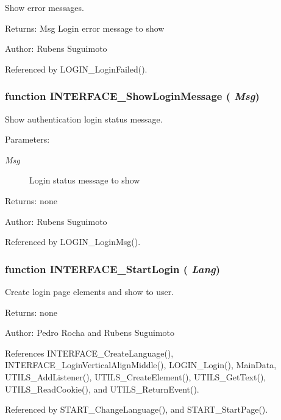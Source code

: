 Show error messages. 

\begin{Desc}
\item[Returns:]Msg Login error message to show \end{Desc}
\begin{Desc}
\item[Author:]Rubens Suguimoto \end{Desc}


Referenced by LOGIN\_\-LoginFailed().
\subsubsection[INTERFACE\_\-ShowLoginMessage]{\setlength{\rightskip}{0pt plus 5cm}function INTERFACE\_\-ShowLoginMessage ( {\em Msg})}\label{interface_2login_8js_fffa8fff6d6c579d05d013a969298342}


Show authentication login status message. 

\begin{Desc}
\item[Parameters:]
\begin{description}
\item[{\em Msg}]Login status message to show \end{description}
\end{Desc}
\begin{Desc}
\item[Returns:]none \end{Desc}
\begin{Desc}
\item[Author:]Rubens Suguimoto \end{Desc}


Referenced by LOGIN\_\-LoginMsg().
\subsubsection[INTERFACE\_\-StartLogin]{\setlength{\rightskip}{0pt plus 5cm}function INTERFACE\_\-StartLogin ( {\em Lang})}\label{interface_2login_8js_919f0023df1f957bd2a395217df85f0f}


Create login page elements and show to user. 

\begin{Desc}
\item[Returns:]none \end{Desc}
\begin{Desc}
\item[Author:]Pedro Rocha and Rubens Suguimoto \end{Desc}


References INTERFACE\_\-CreateLanguage(), INTERFACE\_\-LoginVerticalAlignMiddle(), LOGIN\_\-Login(), MainData, UTILS\_\-AddListener(), UTILS\_\-CreateElement(), UTILS\_\-GetText(), UTILS\_\-ReadCookie(), and UTILS\_\-ReturnEvent().

Referenced by START\_\-ChangeLanguage(), and START\_\-StartPage().